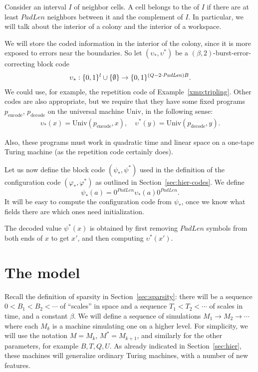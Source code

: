 \documentclass[12pt]{memoir}
\def\B{B}
\def\U{U}
\newcommand{\Q}{Q}
\newcommand{\Tu}{T}
\newcommand{\decode}{\mathrm{decode}}
\newcommand{\encode}{\mathrm{encode}}
\newcommand{\PadLen}{\mathit{PadLen}}
\newcommand{\Un}{\mathrm{Univ}}
\begin{document}
\begin{definition}[Interior]\label{def:interior}
Consider an interval \( I \) of neighbor cells.
A cell belongs to the  of \( I \) if there are at least \( \PadLen \) neighbors between it 
and the complement of \( I \).
In particular, we will talk about the interior of a colony and the interior of a workspace.
\end{definition}

We will store the coded information in the interior of the colony, since it is more exposed 
to errors near the boundaries.
So let \( (\upsilon_{*}, \upsilon^{*}) \) be a \( (\beta,2) \)-burst-error-correcting block code
\begin{align*}
  \upsilon_{*}: \{0,1\}^{l} \cup \set{\emptyset}
   \to\{0,1\}^{(\Q-2\cdot\PadLen)\B}.
\end{align*}
We could use, for example, the repetition code of Example~\ref{xmp:tripling}.
Other codes are also appropriate, but we require that they have some fixed
programs \( p_{\encode} \), \( p_{\decode} \)
on the universal machine \( \Un \), in the following sense:
 \begin{align*}
   \upsilon_{*}(x)=\Un(p_{\encode},x),\quad
   \upsilon^{*}(y)=\Un(p_{\decode}, y).
 \end{align*}

Also, these programs must work in quadratic time and linear space on a one-tape
Turing machine (as the repetition code certainly does).

Let us now define the block code \( (\psi_{*}, \psi^{*}) \) used in the
definition of the configuration code \( (\varphi_{*}, \varphi^{*}) \) as 
outlined in Section~\ref{sec:hier-codes}.
We define
\begin{equation}\label{eq:psi}
   \psi_{*}(a)  = 0^{\PadLen}\upsilon_{*}(a)0^{\PadLen}.
\end{equation}
It will be easy to compute the configuration code from \( \psi_{*} \),
once we know what fields there are which ones need initialization.

The decoded value \( \psi^{*}(x) \) is obtained by first removing \( \PadLen \)
symbols from both ends of \( x \) to get \( x' \), and then computing \(
\upsilon^{*}(x') \).


\section{The model}\label{sec:model}

Recall the definition of sparsity in Section~\ref{sec:sparsity}: there will be 
a sequence \( 0<\B_{1}<\B_{2}<\dotsm \) of ``scales'' in space and a sequence
\( \Tu_{1}<\Tu_{2}<\dotsm \) of scales in time, and a constant \( \beta \).
We will define a sequence of simulations \( M_{1}\to M_{2}\to\dotsm \) where
each \( M_{k} \) is a machine simulating one on a higher level.
For simplicity, we will use the notation \( M=M_{k} \), \( M^{*}=M_{k+1} \),
and similarly for the other parameters, for example \( \B,\Tu, \Q, \U \).
As already indicated in Section~\ref{sec:hier}, these machines will generalize
ordinary Turing machines, with a number of new features.
\end{document}
